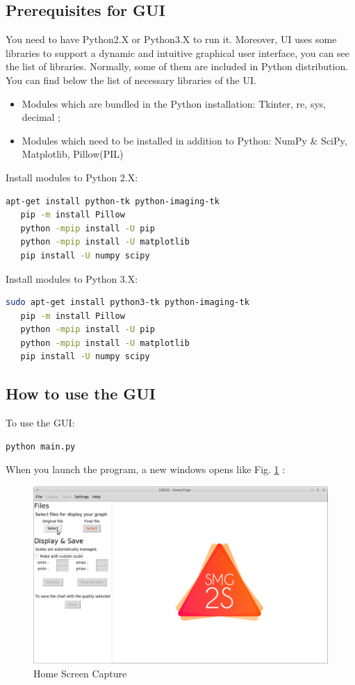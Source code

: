 \documentclass[a4paper, 10 pt]{report}
\begin{document}
	\subsection{Prerequisites for GUI}
	
    You need to have Python2.X or Python3.X to run it. Moreover, UI uses some libraries to support a dynamic and intuitive graphical user interface, you can see the list of libraries. Normally, some of them are included in Python distribution. You can find below the list of necessary libraries of the UI.
	
	\begin{itemize}
    \item Modules which are bundled in the Python installation: Tkinter, re, sys, decimal ;
\item Modules which need to be installed in addition to Python: NumPy \& SciPy, Matplotlib, Pillow(PIL)
	\end{itemize}

	Install modules to Python 2.X:
	\begin{lstlisting}[language=bash,frame=single]
   apt-get install python-tk python-imaging-tk
   pip -m install Pillow
   python -mpip install -U pip
   python -mpip install -U matplotlib
   pip install -U numpy scipy
	\end{lstlisting}

	Install modules to Python 3.X:
	\begin{lstlisting}[language=bash,frame=single]
   sudo apt-get install python3-tk python-imaging-tk
   pip -m install Pillow
   python -mpip install -U pip
   python -mpip install -U matplotlib
   pip install -U numpy scipy
	\end{lstlisting}

	\subsection{How to use the GUI}
	
	To use the GUI:
	\begin{lstlisting}[language=bash,frame=single]
   python main.py
    \end{lstlisting}

When you launch the program, a new windows opens like Fig. \ref{fig:Home Screen Capture} :

	\begin{figure}[htbp]
		\label{fig:Home Screen Capture}
		\caption{Home Screen Capture}
		\centering
		\includegraphics[width=12cm]{home.png}
	\end{figure}
\end{document}
